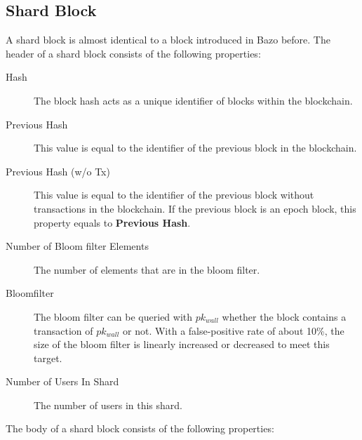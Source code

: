 \subsection{Shard Block}

A shard block is almost identical to a block introduced in Bazo before. The header of a shard block consists of the following properties:

\begin{description}
  \item[Hash] The block hash acts as a unique identifier of blocks within the blockchain.
  \item[Previous Hash] This value is equal to the identifier of the previous block in the blockchain.
  \item[Previous Hash (w/o Tx)] This value is equal to the identifier of the previous block without transactions in the blockchain. If the previous block is an epoch block, this property equals to \textbf{Previous Hash}.
  \item[Number of Bloom filter Elements] The number of elements that are in the bloom filter.
  \item[Bloomfilter] The bloom filter can be queried with $pk_{wall}$ whether the block contains a transaction of $pk_{wall}$ or not. With a false-positive rate of about 10\%, the size of the bloom filter is linearly increased or decreased to meet this target.
  \item[Number of Users In Shard] The number of users in this shard.
\end{description}

\noindent The body of a shard block consists of the following properties:

